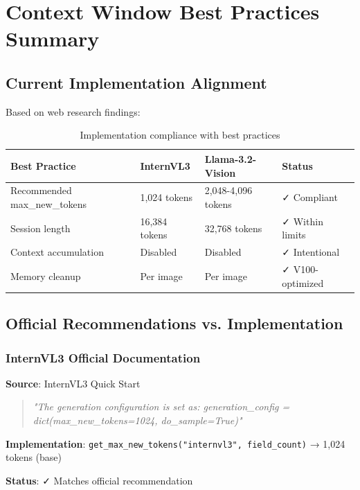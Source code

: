 \documentclass[11pt,a4paper]{article}
\newcommand{\cmark}{\textcolor{green!70!black}{✓}}
\begin{document}
\section{Context Window Best Practices Summary}

\subsection{Current Implementation Alignment}

Based on web research findings:

\begin{table}[h]
\centering
\small
\begin{tabular}{llll}
\toprule
\textbf{Best Practice} & \textbf{InternVL3} & \textbf{Llama-3.2-Vision} & \textbf{Status} \\
\midrule
Recommended max\_new\_tokens & 1,024 tokens & 2,048-4,096 tokens & \cmark{} Compliant \\
Session length & 16,384 tokens & 32,768 tokens & \cmark{} Within limits \\
Context accumulation & Disabled & Disabled & \cmark{} Intentional \\
Memory cleanup & Per image & Per image & \cmark{} V100-optimized \\
\bottomrule
\end{tabular}
\caption{Implementation compliance with best practices}
\end{table}

\subsection{Official Recommendations vs. Implementation}

\subsubsection{InternVL3 Official Documentation}

\textbf{Source}: InternVL3 Quick Start

\begin{quote}
\textit{"The generation configuration is set as: generation\_config = dict(max\_new\_tokens=1024, do\_sample=True)"}
\end{quote}

\textbf{Implementation}: \texttt{get\_max\_new\_tokens("internvl3", field\_count)} → 1,024 tokens (base)

\textbf{Status}: \cmark{} Matches official recommendation
\end{document}
